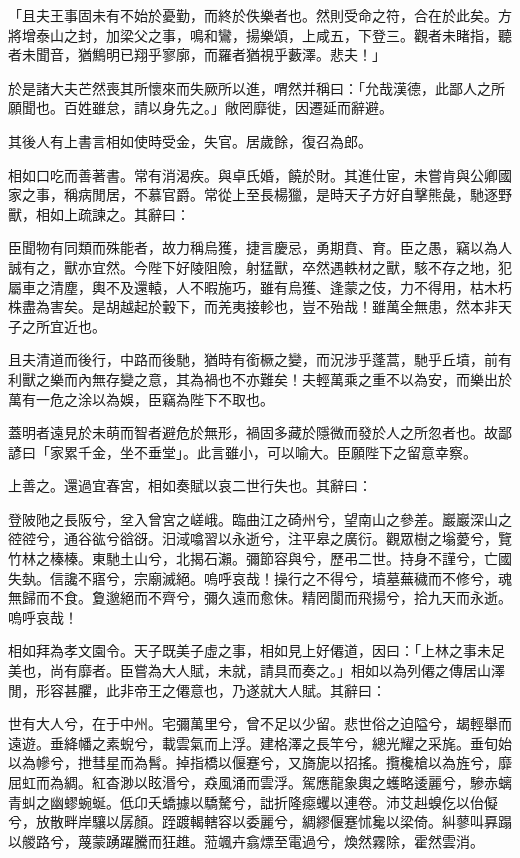 \begin{pinyinscope}
「且夫王事固未有不始於憂勤，而終於佚樂者也。然則受命之符，合在於此矣。方將增泰山之封，加梁父之事，鳴和鸞，揚樂頌，上咸五，下登三。觀者未睹指，聽者未聞音，猶鷦明已翔乎寥廓，而羅者猶視乎藪澤。悲夫！」

於是諸大夫芒然喪其所懷來而失厥所以進，喟然并稱曰：「允哉漢德，此鄙人之所願聞也。百姓雖怠，請以身先之。」敞罔靡徙，因遷延而辭避。

其後人有上書言相如使時受金，失官。居歲餘，復召為郎。

相如口吃而善著書。常有消渴疾。與卓氏婚，饒於財。其進仕宦，未嘗肯與公卿國家之事，稱病閒居，不慕官爵。常從上至長楊獵，是時天子方好自擊熊彘，馳逐野獸，相如上疏諫之。其辭曰：

臣聞物有同類而殊能者，故力稱烏獲，捷言慶忌，勇期賁、育。臣之愚，竊以為人誠有之，獸亦宜然。今陛下好陵阻險，射猛獸，卒然遇軼材之獸，駭不存之地，犯屬車之清塵，輿不及還轅，人不暇施巧，雖有烏獲、逢蒙之伎，力不得用，枯木朽株盡為害矣。是胡越起於轂下，而羌夷接軫也，豈不殆哉！雖萬全無患，然本非天子之所宜近也。

且夫清道而後行，中路而後馳，猶時有銜橛之變，而況涉乎蓬蒿，馳乎丘墳，前有利獸之樂而內無存變之意，其為禍也不亦難矣！夫輕萬乘之重不以為安，而樂出於萬有一危之涂以為娛，臣竊為陛下不取也。

蓋明者遠見於未萌而智者避危於無形，禍固多藏於隱微而發於人之所忽者也。故鄙諺曰「家累千金，坐不垂堂」。此言雖小，可以喻大。臣願陛下之留意幸察。

上善之。還過宜春宮，相如奏賦以哀二世行失也。其辭曰：

登陂阤之長阪兮，坌入曾宮之嵯峨。臨曲江之碕州兮，望南山之參差。巖巖深山之谾谾兮，通谷谹兮谽谺。汨淢噏習以永逝兮，注平皋之廣衍。觀眾樹之塕薆兮，覽竹林之榛榛。東馳土山兮，北揭石瀨。彌節容與兮，歷弔二世。持身不謹兮，亡國失埶。信讒不寤兮，宗廟滅絕。嗚呼哀哉！操行之不得兮，墳墓蕪穢而不修兮，魂無歸而不食。夐邈絕而不齊兮，彌久遠而愈佅。精罔閬而飛揚兮，拾九天而永逝。嗚呼哀哉！

相如拜為孝文園令。天子既美子虛之事，相如見上好僊道，因曰：「上林之事未足美也，尚有靡者。臣嘗為大人賦，未就，請具而奏之。」相如以為列僊之傳居山澤閒，形容甚臞，此非帝王之僊意也，乃遂就大人賦。其辭曰：

世有大人兮，在于中州。宅彌萬里兮，曾不足以少留。悲世俗之迫隘兮，朅輕舉而遠遊。垂絳幡之素蜺兮，載雲氣而上浮。建格澤之長竿兮，總光耀之采旄。垂旬始以為幓兮，抴彗星而為髾。掉指橋以偃蹇兮，又旖旎以招搖。攬欃槍以為旌兮，靡屈虹而為綢。紅杳渺以眩湣兮，猋風涌而雲浮。駕應龍象輿之蠖略逶麗兮，驂赤螭青虯之幽蟉蜿蜒。低卬夭蟜據以驕驁兮，詘折隆癋蠼以連卷。沛艾赳螑仡以佁儗兮，放散畔岸驤以孱顏。跮踱輵轄容以委麗兮，綢繆偃蹇怵毚以梁倚。糾蓼叫奡蹋以艐路兮，蔑蒙踴躍騰而狂趡。蒞颯卉翕熛至電過兮，煥然霧除，霍然雲消。


\end{pinyinscope}
